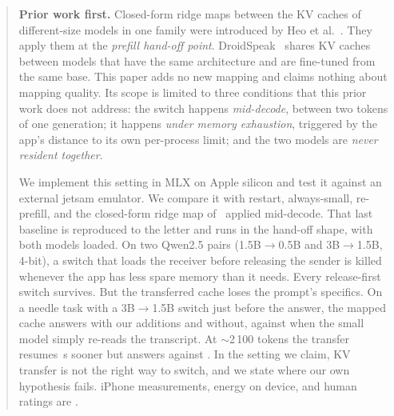 \begin{abstract}
\noindent\textbf{Prior work first.}
Closed-form ridge maps between the KV caches of different-size models in one family were introduced by Heo et al.~\citep{heo2026crossmodel}.
They apply them at the \emph{prefill hand-off point}.
DroidSpeak~\citep{liu2024droidspeak} shares KV caches between models that have the same architecture and are fine-tuned from the same base.
This paper adds no new mapping and claims nothing about mapping quality.
Its scope is limited to three conditions that this prior work does not address:
the switch happens \emph{mid-decode}, between two tokens of one generation;
it happens \emph{under memory exhaustion}, triggered by the app's distance to its own per-process limit;
and the two models are \emph{never resident together}.

We implement this setting in MLX on Apple silicon and test it against an external jetsam emulator.
We compare it with restart, always-small, re-prefill, and the closed-form ridge map of~\citep{heo2026crossmodel} applied mid-decode.
That last baseline is reproduced to the letter and runs in the hand-off shape, with both models loaded.
On two Qwen2.5 pairs (1.5B$\to$0.5B and 3B$\to$1.5B, 4-bit), a switch that loads the receiver before releasing the sender is killed whenever the app has less spare memory than it needs.
Every release-first switch survives.
But the transferred cache loses the prompt's specifics.
On a needle task with a 3B$\to$1.5B switch just before the answer, the mapped cache answers  with our additions and  without, against  when the small model simply re-reads the transcript.
At $\sim$2\,100 tokens the transfer resumes \,s sooner but answers  against .
In the setting we claim, KV transfer is not the right way to switch, and we state where our own hypothesis fails.
iPhone measurements, energy on device, and human ratings are .
\end{abstract}
